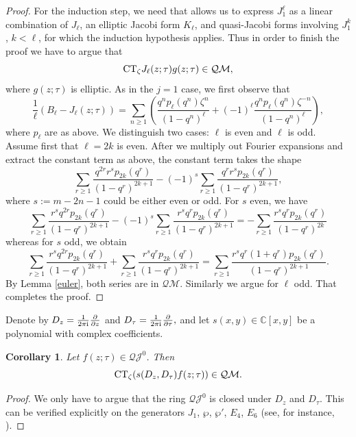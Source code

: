 \documentclass[pdftex]{sigma}
\numberwithin{equation}{section}
\newtheorem{Corollary}[Theorem]{Corollary}
\theoremstyle{definition}
\begin{document}
\begin{proof}
For the induction step, we need \cite[formula~(11)]{Ob-Serre} that allows us to express $J_1^\ell$ as a linear combination of $J_\ell$, an elliptic Jacobi form $K_\ell$, and quasi-Jacobi forms involving $J_1^k$, $k < \ell$, for which the induction hypothesis applies.
Thus in order to finish the proof we have to argue that
\[
{\rm CT}_\zeta J_\ell(z;\tau) g(z;\tau) \in \mathcal{QM},
\]
where $g(z;\tau)$ is elliptic. As in the $j=1$ case, we first observe that
\[
\frac{1}{\ell}(B_{\ell}-J_{\ell}(z;\tau))=\sum_{n \geq 1}\left( \frac{q^n p_\ell(q^n) \zeta^n}{(1-q^n)^\ell} + (-1)^\ell \frac{q^n p_\ell(q^n) \zeta^{-n}}{(1-q^n)^\ell} \right),
\]
where $p_\ell$ are as above. We distinguish two cases: $\ell$ is even and $\ell$ is odd.
Assume first that $\ell=2k$ is even.
After we multiply out Fourier expansions and extract the constant term as above, the constant term takes the shape
\[
\sum_{r \geq 1} \frac{q^{2r} r^s p_{2k}(q^r)}{(1-q^r)^{2k+1}} - (-1)^{s} \sum_{r \geq 1} \frac{q^{r} r^s p_{2k}(q^r)}{(1-q^r)^{2k+1}},
\]
where $s:=m - 2 n-1$ could be either even or odd. For $s$ even, we have
\begin{equation*} %
\sum_{r \geq 1} \frac{r^s q^{2r} p_{2k}(q^r)}{(1-q^r)^{2k+1}} - (-1)^{s} \sum_{r \geq 1} \frac{r^s q^{r} p_{2k}(q^r)}{(1-q^r)^{2k+1}}=- \sum_{r \geq 1} \frac{r^s q^{r}p_{2k}(q^r)}{(1-q^r)^{2k}}
\end{equation*}
whereas for $s$ odd, we obtain
\begin{equation*} %
\sum_{r \geq 1} \frac{r^s q^{2r} p_{2k} (q^r)}{(1-q^r)^{2k+1}} + \sum_{r \geq 1} \frac{r^s q^{r} p_{2k}(q^r)}{(1-q^r)^{2k+1}}=\sum_{r \geq 1} \frac{r^s q^{r}(1+q^r) p_{2k}(q^r)}{(1-q^r)^{2k+1}}.
\end{equation*}
By Lemma \ref{euler}, both series are in $\mathcal{QM}$.
Similarly we argue for $\ell$ odd. That completes the proof.
\end{proof}

Denote by $D_z=\frac{1}{2 \pi {\rm i} } \frac{\partial}{\partial z}$ and ${D}_\tau=\frac{1}{2 \pi {\rm i}} \frac{\partial}{\partial \tau},$ and let $s(x,y) \in \mathbb{C}[x,y]$ be a polynomial with complex coefficients.
\begin{Corollary} \label{const} Let $f(z;\tau) \in \mathcal{QJ}^{0}$. Then
\[
{\rm CT}_\zeta (s(D_z,D_\tau) f(z;\tau) ) \in \mathcal{QM}.
\]
\end{Corollary}
\begin{proof} We only have to argue that the ring $\mathcal{QJ}^{0}$ is closed under $D_z$ and $D_\tau$. This can be verified explicitly on the generators $J_1$, $\wp$, $\wp'$, $E_4$, $E_6$ (see, for instance, \cite{Ob, Ittersum}).
\end{proof}
\end{document}
